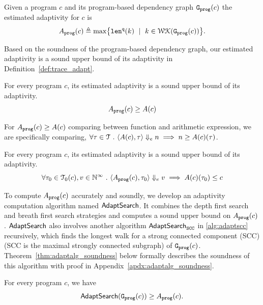 %
%
%
\begin{defn}
\label{def:prog_adapt}
{
Given a program ${c}$ and its program-based dependency graph 
$\mathtt{{G_{prog}}}({c})$
%
the estimated adaptivity for $c$ is 
\[
\progA({c})
\triangleq \max
\left\{ \qlen(k) \ \mid \  k \in \walks(\progG(c))\right \}.
\]
}
\end{defn}
Based on the soundness of the program-based dependency graph, our estimated adaptivity is a sound upper bound of its adaptivity in Definition~\ref{def:trace_adapt}. 
\begin{thm}
    For every program $c$, 
    its estimated adaptivity is a sound upper bound of its adaptivity.
     $$  A_{\mathtt{prog}}(c) \geq A(c)$$
\end{thm}
For $A_{\mathtt{prog}}(c) \geq A(c)$ comparing between function and arithmetic expression,
we are specifically comparing, $\forall \mathtt{\tau} \in \mathcal{T} ~.~ 
\langle A(c), \mathtt{\tau} \rangle \Downarrow_e n \implies n \geq A(c)(\mathtt{\tau}) $.
%
\begin{thm}
  \label{thm:sound_progadapt}
  For every program $c$, 
  its estimated adaptivity is a sound upper bound of its adaptivity.
   \[
   \forall \mathtt{\tau}_0 \in \mathcal{T}_{0}(c), v \in \mathbb{N}^{\infty} ~.~ 
\langle A_{\mathtt{prog}}(c), \mathtt{\tau}_0 \rangle \Downarrow_e v \implies A(c)(\mathtt{\tau}_0) \leq c
\] 
\end{thm}
%
To compute $A_{\mathtt{prog}}(c)$ accurately and soundly, we develop an adaptivity computation algorithm named $\mathsf{AdaptSearch}$.
It combines the depth first search and breath first search strategies and computes a sound upper bound on $A_{\mathtt{prog}}(c)$.
$\mathsf{AdaptSearch}$ also involves another algorithm $\mathsf{AdaptSearch}_{\mathtt{SCC}}$ in \ref{alg:adaptscc} recursively, which finds the longest walk for a strong connected component (SCC) (SCC is the maximal strongly connected subgraph) of $\mathtt{{G_{prog}}}(c)$.
Theorem~\ref{thm:adaptalg_soundness} below formally describes the soundness of this algorithm with proof in Appendix~\ref{apdx:adaptalg_soundness}.
\begin{thm}
    \label{thm:adaptalg_soundness}
    For every program $c$, we have
     $$\mathsf{AdaptSearch}(\mathtt{{G_{prog}}}({c})) \geq A_{\mathtt{prog}}(c).$$
\end{thm}

